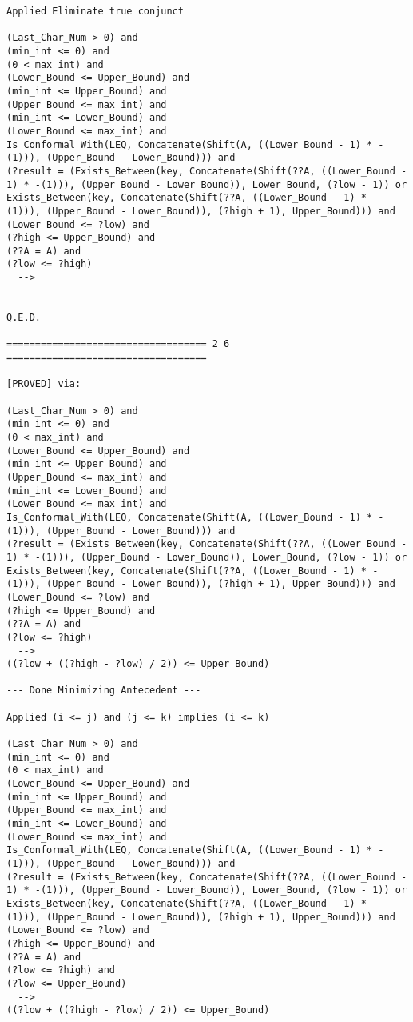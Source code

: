 \begin{lstlisting}[language=resolve]
Applied Eliminate true conjunct

(Last_Char_Num > 0) and
(min_int <= 0) and
(0 < max_int) and
(Lower_Bound <= Upper_Bound) and
(min_int <= Upper_Bound) and
(Upper_Bound <= max_int) and
(min_int <= Lower_Bound) and
(Lower_Bound <= max_int) and
Is_Conformal_With(LEQ, Concatenate(Shift(A, ((Lower_Bound - 1) * -(1))), (Upper_Bound - Lower_Bound))) and
(?result = (Exists_Between(key, Concatenate(Shift(??A, ((Lower_Bound - 1) * -(1))), (Upper_Bound - Lower_Bound)), Lower_Bound, (?low - 1)) or Exists_Between(key, Concatenate(Shift(??A, ((Lower_Bound - 1) * -(1))), (Upper_Bound - Lower_Bound)), (?high + 1), Upper_Bound))) and
(Lower_Bound <= ?low) and
(?high <= Upper_Bound) and
(??A = A) and
(?low <= ?high)
  -->


Q.E.D.

=================================== 2_6 ===================================

[PROVED] via:

(Last_Char_Num > 0) and
(min_int <= 0) and
(0 < max_int) and
(Lower_Bound <= Upper_Bound) and
(min_int <= Upper_Bound) and
(Upper_Bound <= max_int) and
(min_int <= Lower_Bound) and
(Lower_Bound <= max_int) and
Is_Conformal_With(LEQ, Concatenate(Shift(A, ((Lower_Bound - 1) * -(1))), (Upper_Bound - Lower_Bound))) and
(?result = (Exists_Between(key, Concatenate(Shift(??A, ((Lower_Bound - 1) * -(1))), (Upper_Bound - Lower_Bound)), Lower_Bound, (?low - 1)) or Exists_Between(key, Concatenate(Shift(??A, ((Lower_Bound - 1) * -(1))), (Upper_Bound - Lower_Bound)), (?high + 1), Upper_Bound))) and
(Lower_Bound <= ?low) and
(?high <= Upper_Bound) and
(??A = A) and
(?low <= ?high)
  -->
((?low + ((?high - ?low) / 2)) <= Upper_Bound)

--- Done Minimizing Antecedent ---

Applied (i <= j) and (j <= k) implies (i <= k)

(Last_Char_Num > 0) and
(min_int <= 0) and
(0 < max_int) and
(Lower_Bound <= Upper_Bound) and
(min_int <= Upper_Bound) and
(Upper_Bound <= max_int) and
(min_int <= Lower_Bound) and
(Lower_Bound <= max_int) and
Is_Conformal_With(LEQ, Concatenate(Shift(A, ((Lower_Bound - 1) * -(1))), (Upper_Bound - Lower_Bound))) and
(?result = (Exists_Between(key, Concatenate(Shift(??A, ((Lower_Bound - 1) * -(1))), (Upper_Bound - Lower_Bound)), Lower_Bound, (?low - 1)) or Exists_Between(key, Concatenate(Shift(??A, ((Lower_Bound - 1) * -(1))), (Upper_Bound - Lower_Bound)), (?high + 1), Upper_Bound))) and
(Lower_Bound <= ?low) and
(?high <= Upper_Bound) and
(??A = A) and
(?low <= ?high) and
(?low <= Upper_Bound)
  -->
((?low + ((?high - ?low) / 2)) <= Upper_Bound)


\end{lstlisting}
